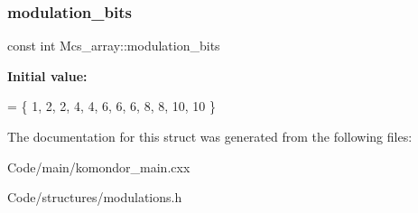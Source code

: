 \subsubsection{\texorpdfstring{modulation\+\_\+bits}{modulation\_bits}}
{\footnotesize\ttfamily const int Mcs\+\_\+array\+::modulation\+\_\+bits\hspace{0.3cm}{\ttfamily [static]}}

{\bfseries Initial value\+:}
\begin{DoxyCode}
= \{ 
    1,  
    2,  
    2,  
    4,  
    4,  
    6,  
    6,  
    6,  
    8,  
    8,  
    10, 
    10  
\}
\end{DoxyCode}


The documentation for this struct was generated from the following files\+:\begin{DoxyCompactItemize}
\item 
Code/main/komondor\+\_\+main.\+cxx\item 
Code/structures/modulations.\+h\end{DoxyCompactItemize}
